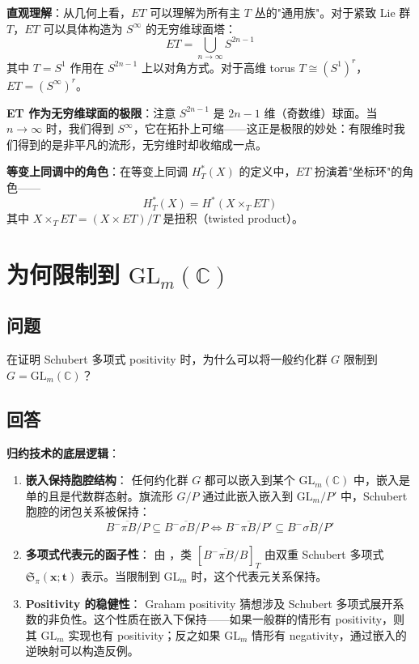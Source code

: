 \textbf{直观理解}：从几何上看，$ET$ 可以理解为所有主 $T$ 丛的"通用族"。对于紧致 Lie 群 $T$，$ET$ 可以具体构造为 $S^\infty$ 的无穷维球面塔：
$$ET = \bigcup_{n \to \infty} S^{2n-1}$$
其中 $T = S^1$ 作用在 $S^{2n-1}$ 上以对角方式。对于高维 torus $T \cong (S^1)^r$，$ET = (S^\infty)^r$。

\textbf{ET 作为无穷维球面的极限}：注意 $S^{2n-1}$ 是 $2n-1$ 维（奇数维）球面。当 $n \to \infty$ 时，我们得到 $S^\infty$，它在拓扑上可缩——这正是极限的妙处：有限维时我们得到的是非平凡的流形，无穷维时却收缩成一点。

\textbf{等变上同调中的角色}：在等变上同调 $H_T^*(X)$ 的定义中，$ET$ 扮演着"坐标环"的角色——
$$H_T^*(X) = H^*(X \times_T ET)$$
其中 $X \times_T ET = (X \times ET)/T$ 是扭积（twisted product）。

\section{为何限制到 $\mathrm{GL}_m(\mathbb{C})$}\label{sec:WhyGLm}
\subsection{问题}
在证明 Schubert 多项式 positivity 时，为什么可以将一般约化群 $G$ 限制到 $G = \mathrm{GL}_m(\mathbb{C})$？

\subsection{回答}
\textbf{归约技术的底层逻辑}：
\begin{enumerate}
\item \textbf{嵌入保持胞腔结构}：
任何约化群 $G$ 都可以嵌入到某个 $\mathrm{GL}_m(\mathbb{C})$ 中，嵌入是单的且是代数群态射。旗流形 $G/P$ 通过此嵌入嵌入到 $\mathrm{GL}_m/P'$ 中，Schubert 胞腔的闭包关系被保持：
$$\overline{B^-\pi B/P} \subseteq \overline{B^-\sigma B/P} \iff \overline{B^-\pi B/P'} \subseteq \overline{B^-\sigma B/P'}$$

\item \textbf{多项式代表元的函子性}：
由 \cite[ Theorem 10.6.4]{anderson2023}，类 $[\overline{B^-\pi B/B}]_T$ 由双重 Schubert 多项式 $\mathfrak{S}_\pi(\mathbf{x}; \mathbf{t})$ 表示。当限制到 $\mathrm{GL}_m$ 时，这个代表元关系保持。

\item \textbf{Positivity 的稳健性}：
Graham positivity 猜想涉及 Schubert 多项式展开系数的非负性。这个性质在嵌入下保持——如果一般群的情形有 positivity，则其 $\mathrm{GL}_m$ 实现也有 positivity；反之如果 $\mathrm{GL}_m$ 情形有 negativity，通过嵌入的逆映射可以构造反例。
\end{enumerate}

